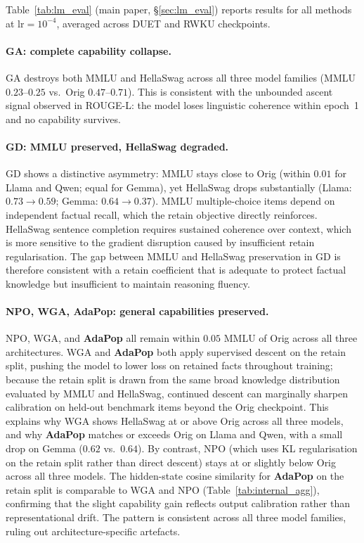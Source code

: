 Table~\ref{tab:lm_eval} (main paper, §\ref{sec:lm_eval}) reports results for all methods at $\text{lr}=10^{-4}$, averaged across DUET and RWKU checkpoints.

\paragraph{GA: complete capability collapse.}
GA destroys both MMLU and HellaSwag across all three model families (MMLU $0.23$--$0.25$ vs.\ Orig $0.47$--$0.71$). This is consistent with the unbounded ascent signal observed in ROUGE-L: the model loses linguistic coherence within epoch~1 and no capability survives.

\paragraph{GD: MMLU preserved, HellaSwag degraded.}
GD shows a distinctive asymmetry: MMLU stays close to Orig (within $0.01$ for Llama and Qwen; equal for Gemma), yet HellaSwag drops substantially (Llama: $0.73 \to 0.59$; Gemma: $0.64 \to 0.37$). MMLU multiple-choice items depend on independent factual recall, which the retain objective directly reinforces. HellaSwag sentence completion requires sustained coherence over context, which is more sensitive to the gradient disruption caused by insufficient retain regularisation. The gap between MMLU and HellaSwag preservation in GD is therefore consistent with a retain coefficient that is adequate to protect factual knowledge but insufficient to maintain reasoning fluency.

\paragraph{NPO, WGA, AdaPop: general capabilities preserved.}
NPO, WGA, and \textbf{AdaPop} all remain within $0.05$ MMLU of Orig across all three architectures. WGA and \textbf{AdaPop} both apply supervised descent on the retain split, pushing the model to lower loss on retained facts throughout training; because the retain split is drawn from the same broad knowledge distribution evaluated by MMLU and HellaSwag, continued descent can marginally sharpen calibration on held-out benchmark items beyond the Orig checkpoint. This explains why WGA shows HellaSwag at or above Orig across all three models, and why \textbf{AdaPop} matches or exceeds Orig on Llama and Qwen, with a small drop on Gemma ($0.62$ vs.\ $0.64$). By contrast, NPO (which uses KL regularisation on the retain split rather than direct descent) stays at or slightly below Orig across all three models. The hidden-state cosine similarity for \textbf{AdaPop} on the retain split is comparable to WGA and NPO (Table~\ref{tab:internal_agg}), confirming that the slight capability gain reflects output calibration rather than representational drift. The pattern is consistent across all three model families, ruling out architecture-specific artefacts.

